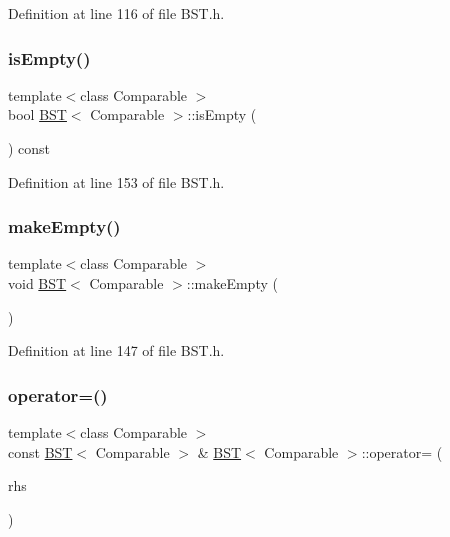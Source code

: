Definition at line 116 of file B\+S\+T.\+h.

\hypertarget{class_b_s_t_a10fd737b2be62437023407fdc123f728}{}\label{class_b_s_t_a10fd737b2be62437023407fdc123f728} 
\subsubsection{\texorpdfstring{is\+Empty()}{isEmpty()}}
{\footnotesize\ttfamily template$<$class Comparable $>$ \\
bool \hyperlink{class_b_s_t}{B\+ST}$<$ Comparable $>$\+::is\+Empty (\begin{DoxyParamCaption}{ }\end{DoxyParamCaption}) const}



Definition at line 153 of file B\+S\+T.\+h.

\hypertarget{class_b_s_t_a050d829503a88714c4ad0773cf6d3af6}{}\label{class_b_s_t_a050d829503a88714c4ad0773cf6d3af6} 
\subsubsection{\texorpdfstring{make\+Empty()}{makeEmpty()}}
{\footnotesize\ttfamily template$<$class Comparable $>$ \\
void \hyperlink{class_b_s_t}{B\+ST}$<$ Comparable $>$\+::make\+Empty (\begin{DoxyParamCaption}{ }\end{DoxyParamCaption})}



Definition at line 147 of file B\+S\+T.\+h.

\hypertarget{class_b_s_t_aa80c39f454c89d4a202be3d1445823f3}{}\label{class_b_s_t_aa80c39f454c89d4a202be3d1445823f3} 
\subsubsection{\texorpdfstring{operator=()}{operator=()}}
{\footnotesize\ttfamily template$<$class Comparable $>$ \\
const \hyperlink{class_b_s_t}{B\+ST}$<$ Comparable $>$ \& \hyperlink{class_b_s_t}{B\+ST}$<$ Comparable $>$\+::operator= (\begin{DoxyParamCaption}\item[{const \hyperlink{class_b_s_t}{B\+ST}$<$ Comparable $>$ \&}]{rhs }\end{DoxyParamCaption})}



